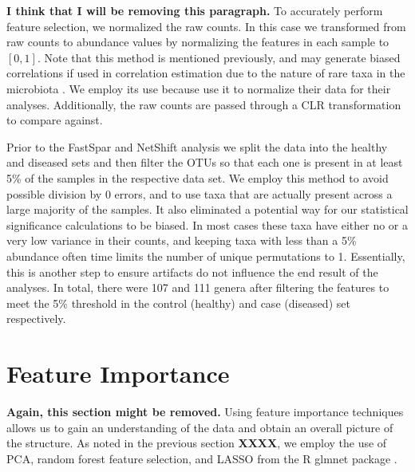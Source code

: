 \textbf{I think that I will be removing this paragraph.}
To accurately perform feature selection, we normalized the raw counts. In this case we transformed from raw counts to abundance values by normalizing the features in each sample to $[0,1]$. Note that this method is mentioned previously, and may generate biased correlations if used in correlation estimation due to the nature of rare taxa in the microbiota \citep{Friedman2012,McMurdie2014,Gloor2017}. We employ its use because \citeauthor{Duvallet2017} use it to normalize their data for their analyses. 
 Additionally, the raw counts are passed through a \acrshort{CLR} transformation to compare against.


Prior to the FastSpar and NetShift analysis we split the data into the healthy and diseased sets and then filter the \acrshort{OTU}s so that each one is present in at least 5\% of the samples in the respective data set. We employ this method to avoid possible division by 0 errors, and to use taxa that are actually present across a large majority of the samples. It also eliminated a potential way for our statistical significance calculations to be biased. In most cases these taxa have either no or a very low variance in their counts, and keeping taxa with less than a 5\% abundance often time limits the number of unique permutations to 1. Essentially, this is another step to ensure artifacts do not influence the end result of the analyses. In total, there were 107 and 111 genera after filtering the features to meet the 5\% threshold in the control (healthy) and case (diseased) set respectively.

\section{Feature Importance}\label{meth:features}
\textbf{Again, this section might be removed.}
Using feature importance techniques allows us to gain an understanding of the data and obtain an overall picture of the structure. As noted in the previous section \textbf{XXXX}, we employ the use of \acrfull{PCA}, random forest feature selection, and \acrfull{LASSO} from the R glmnet package \citep{Friedman2010_glmnet}.

